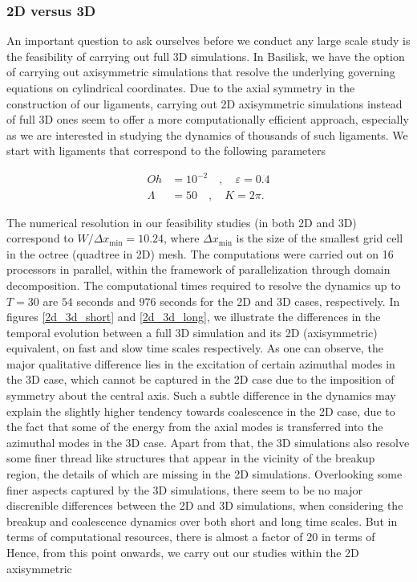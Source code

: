 \subsubsection*{2D versus 3D}

An important question to ask ourselves before we conduct any large scale
study is the feasibility of carrying out full 3D simulations. 
In Basilisk, we have the option of carrying out axisymmetric simulations
that resolve the underlying governing equations on cylindrical coordinates. 
Due to the axial symmetry in the construction of our ligaments, carrying 
out 2D axisymmetric simulations instead of full 3D ones seem to offer a more 
computationally efficient approach, especially as we are interested in studying
the dynamics of thousands of such ligaments. 
We start with ligaments that correspond to the following parameters

\begin{align}
	Oh &= 10^{-2} \quad, \quad \varepsilon = 0.4  \\
	\Lambda &= 50 \quad , \quad K = 2\pi .
\label{base_params}
\end{align}

The numerical resolution in our feasibility studies (in both 2D and 3D) correspond to 
$W / \Delta x_{\textrm{min}} = 10.24$, where $\Delta x_{\textrm{min}}$ is the size 
of the smallest grid cell in the octree (quadtree in 2D) mesh. 
The computations were carried out on 16 processors in parallel, within the framework
of parallelization through domain decomposition.
The computational times required to resolve the dynamics up to $T = 30$ are $54$ seconds 
and $976$ seconds for the 2D and 3D cases, respectively. 
In figures \ref{2d_3d_short} and \ref{2d_3d_long}, we illustrate the differences 
in the temporal evolution between a full 3D simulation and its 2D (axisymmetric)
equivalent, on fast and slow time scales respectively. 
As one can observe, the major qualitative difference 
lies in the excitation of certain azimuthal modes in the 3D case, 
which cannot be captured in the 2D case due to the 
imposition of symmetry about the central axis.
Such a subtle difference in the dynamics may 
explain the slightly higher tendency towards coalescence 
in the 2D case, due to the fact that some of the energy from 
the axial modes is transferred into the azimuthal modes in the 3D case. 
Apart from that, the 3D simulations also resolve some 
finer thread like structures that appear in the vicinity 
of the breakup region, the details of which are missing in the 2D simulations.  
Overlooking some finer aspects captured by the 3D simulations,  
there seem to be no major discrenible differences between the 2D and 3D simulations,
when considering the breakup and coalescence dynamics over both short and long time scales.
But in terms of computational resources, there is almost a factor of $20$ in terms 
of
Hence, from this point onwards, we carry out our studies within the 2D axisymmetric 


